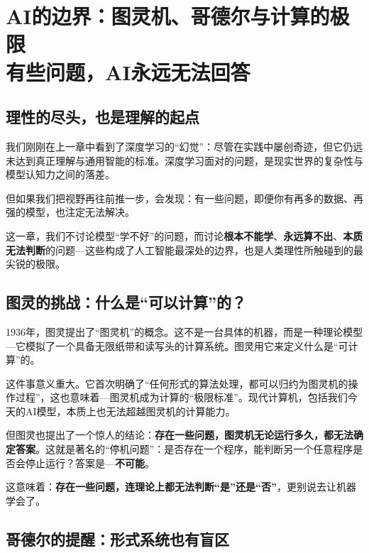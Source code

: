  
 \chapter{AI的边界：图灵机、哥德尔与计算的极限 \texorpdfstring{\\}{ }有些问题，AI永远无法回答}

 
\section*{理性的尽头，也是理解的起点}

我们刚刚在上一章中看到了深度学习的“幻觉”：尽管在实践中屡创奇迹，但它仍远未达到真正理解与通用智能的标准。深度学习面对的问题，是现实世界的复杂性与模型认知力之间的落差。

但如果我们把视野再往前推一步，会发现：有一些问题，即便你有再多的数据、再强的模型，也注定无法解决。

这一章，我们不讨论模型“学不好”的问题，而讨论\textbf{根本不能学}、\textbf{永远算不出}、\textbf{本质无法判断}的问题---这些构成了人工智能最深处的边界，也是人类理性所触碰到的最尖锐的极限。

\section*{图灵的挑战：什么是“可以计算”的？}

1936年，图灵提出了“图灵机”的概念。这不是一台具体的机器，而是一种理论模型---它模拟了一个具备无限纸带和读写头的计算系统。图灵用它来定义什么是“可计算”的。

这件事意义重大。它首次明确了“任何形式的算法处理，都可以归约为图灵机的操作过程”，这也意味着---图灵机成为计算的“极限标准”。现代计算机，包括我们今天的AI模型，本质上也无法超越图灵机的计算能力。

但图灵也提出了一个惊人的结论：\textbf{存在一些问题，图灵机无论运行多久，都无法确定答案}。这就是著名的“停机问题”：是否存在一个程序，能判断另一个任意程序是否会停止运行？答案是---\textbf{不可能}。

这意味着：\textbf{存在一些问题，连理论上都无法判断“是”还是“否”}，更别说去让机器学会了。

\section*{哥德尔的提醒：形式系统也有盲区}

